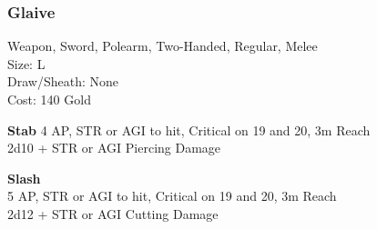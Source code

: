 \subsubsection{Glaive}\label{weapon:glaive}
Weapon, Sword, Polearm, Two-Handed, Regular, Melee\\
Size: L\\
Draw/Sheath: None\\
Cost: 140 Gold

\textbf{Stab}
4 AP, STR or AGI to hit, Critical on 19 and 20, 3m Reach\\
2d10 + \texttimes STR or AGI Piercing Damage

\textbf{Slash}\\
5 AP, STR or AGI to hit, Critical on 19 and 20, 3m Reach\\
2d12 + \texttimes STR or AGI Cutting Damage

